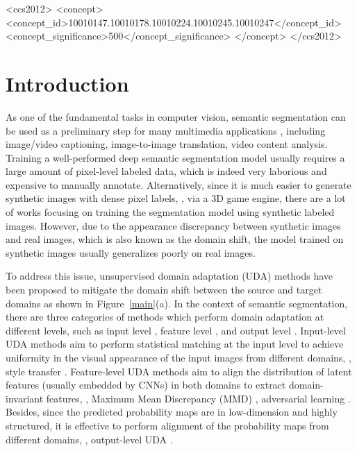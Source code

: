 \documentclass[sigconf]{acmart}
\begin{document}
\begin{CCSXML}
<ccs2012>
<concept>
<concept_id>10010147.10010178.10010224.10010245.10010247</concept_id>
<concept_significance>500</concept_significance>
</concept>
</ccs2012>
\end{CCSXML}






\maketitle

\section{Introduction}
As one of the fundamental tasks in computer vision, semantic segmentation can be used as a preliminary step for many multimedia applications \cite{ye2020textfusenet,zhang2020empowering,chen2019progressive,vitae}, including image/video captioning, image-to-image translation, video content analysis. 
Training a well-performed deep semantic segmentation model usually requires a large amount of pixel-level labeled data, which is indeed very laborious and expensive to manually annotate. Alternatively, since it is much easier to generate synthetic images with dense pixel labels, , via a 3D game engine, there are a lot of works focusing on training the segmentation model using synthetic labeled images. However, due to the appearance discrepancy between synthetic images and real images, which is also known as the domain shift, the model trained on synthetic images usually generalizes poorly on real images.


To address this issue, unsupervised domain adaptation (UDA) methods have been proposed to mitigate the domain shift between the source and target domains as shown in Figure~\ref{main}(a). In the context of semantic segmentation, there are three categories of methods which perform domain adaptation at different levels, such as input level \cite{dacs,gl}, feature level \cite{cag,CLAN_pami,proda}, and output level \cite{fcns,crdoco}. Input-level UDA methods aim to perform statistical matching at the input level to achieve uniformity in the visual appearance of the input images from different domains, , style transfer \cite{cycada}. Feature-level UDA methods aim to align the distribution of latent features (usually embedded by CNNs) in both domains to extract domain-invariant features, , Maximum Mean Discrepancy (MMD) \cite{mmd}, adversarial learning \cite{gan}. Besides, since the predicted probability maps are in low-dimension and highly structured, it is effective to perform alignment of the probability maps from different domains, , output-level UDA \cite{crdoco}.
\end{document}
